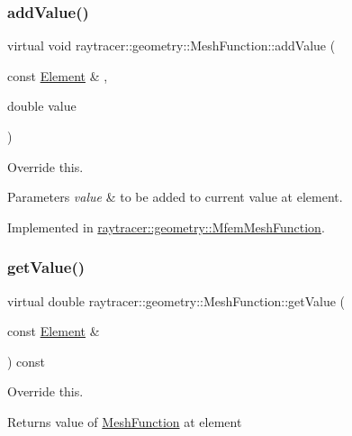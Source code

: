 \subsubsection{\texorpdfstring{add\+Value()}{addValue()}}
{\footnotesize\ttfamily virtual void raytracer\+::geometry\+::\+Mesh\+Function\+::add\+Value (\begin{DoxyParamCaption}\item[{const \hyperlink{classraytracer_1_1geometry_1_1Element}{Element} \&}]{,  }\item[{double}]{value }\end{DoxyParamCaption})\hspace{0.3cm}{\ttfamily [pure virtual]}}



Override this. 


\begin{DoxyParams}{Parameters}
{\em value} & to be added to current value at element. \\
\hline
\end{DoxyParams}


Implemented in \hyperlink{classraytracer_1_1geometry_1_1MfemMeshFunction_a886efe65ad4667b09e00381c57bb7be8}{raytracer\+::geometry\+::\+Mfem\+Mesh\+Function}.

\mbox{\label{classraytracer_1_1geometry_1_1MeshFunction_a8e8a42e0d1793e48146ac7aaf98026c4}} 
\subsubsection{\texorpdfstring{get\+Value()}{getValue()}}
{\footnotesize\ttfamily virtual double raytracer\+::geometry\+::\+Mesh\+Function\+::get\+Value (\begin{DoxyParamCaption}\item[{const \hyperlink{classraytracer_1_1geometry_1_1Element}{Element} \&}]{ }\end{DoxyParamCaption}) const\hspace{0.3cm}{\ttfamily [pure virtual]}}



Override this. 

\begin{DoxyReturn}{Returns}
value of \hyperlink{classraytracer_1_1geometry_1_1MeshFunction}{Mesh\+Function} at element 
\end{DoxyReturn}


